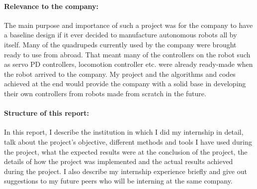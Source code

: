 \documentclass[12pt]{article}
\begin{document}
\paragraph{Relevance to the company:} The main purpose and importance of such a project was for the company to have a baseline design if it ever decided to manufacture autonomous robots all by itself. Many of the quadrupeds currently used by the company were brought ready to use from abroad. That meant many of the controllers on the robot such as servo PD controllers, locomotion controller etc. were already ready-made when the robot  arrived to the company. My project and the algorithms and codes achieved at the end would provide the company with a solid base in developing their own controllers from robots made from scratch in the future.
\paragraph{Structure of this report:} In this report, I describe the institution in which I did my internship in detail, talk about the project's objective, different methods and tools I have used during the project, what the expected results were at the conclusion of the project, the details of how the project was implemented and the actual results achieved during the project. I also describe my internship experience briefly and give out suggestions to my future peers who will be interning at the same company.
\end{document}
